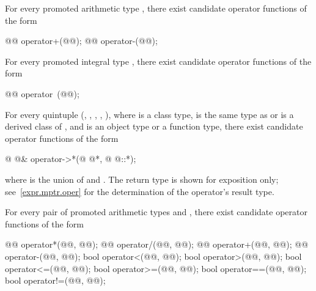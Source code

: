 \pnum
For every promoted arithmetic type
,
there exist candidate operator functions of the form

\begin{codeblock}
@@ operator+(@@);
@@ operator-(@@);
\end{codeblock}

\pnum
For every promoted integral type
,
there exist candidate operator functions of the form

\begin{codeblock}
@@ operator~(@@);
\end{codeblock}

\pnum
For every quintuple
(,
,
,
,
),
where
is a class type,
is the same type as  or is a derived class of , and
is an object type or a function type,
there exist candidate operator functions of the form

\begin{codeblock}
@ @& operator->*(@ @*, @ @::*);
\end{codeblock}

where  is the union of  and .
The return type is shown for exposition only; see~\ref{expr.mptr.oper} for the
determination of the operator's result type.

\pnum
For every pair of promoted arithmetic types
and
,
there exist candidate operator functions of the form

\begin{codeblock}
@@      operator*(@@, @@);
@@      operator/(@@, @@);
@@      operator+(@@, @@);
@@      operator-(@@, @@);
bool    operator<(@@, @@);
bool    operator>(@@, @@);
bool    operator<=(@@, @@);
bool    operator>=(@@, @@);
bool    operator==(@@, @@);
bool    operator!=(@@, @@);
\end{codeblock}

